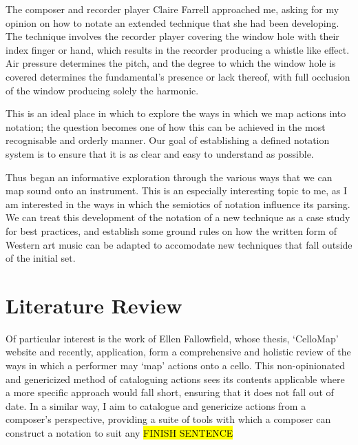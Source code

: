 The composer and recorder player Claire Farrell approached me, asking for my opinion on how to notate an extended technique that she had been developing. 
The technique involves the recorder player covering the window hole with their index finger or hand, which results in the recorder producing a whistle like effect. 
Air pressure determines the pitch, and the degree to which the window hole is covered determines the fundamental's presence or lack thereof, with full occlusion of the window producing solely the harmonic. 

This is an ideal place in which to explore the ways in which we map actions into notation; the question becomes one of how this can be achieved in the most recognisable and orderly manner. 
Our goal of establishing a defined notation system is to ensure that it is as clear and easy to understand as possible. 

Thus began an informative exploration through the various ways that we can map sound onto an instrument. 
This is an especially interesting topic to me, as I am interested in the ways in which the semiotics of notation influence its parsing. 
We can treat this development of the notation of a new technique as a case study for best practices, and establish some ground rules on how the written form of Western art music can be adapted to accomodate new techniques that fall outside of the initial set.

\section{Literature Review}
Of particular interest is the work of Ellen Fallowfield, whose thesis, `CelloMap' website and recently, application, form a comprehensive and holistic review of the ways in which a performer may `map' actions onto a cello.\autocite[]{fallowfieldCelloMapHandbook2009,fallowfieldCelloMap}
This non-opinionated and genericized method of cataloguing actions sees its contents applicable where a more specific approach would fall short, ensuring that it does not fall out of date.
In a similar way, I aim to catalogue and genericize actions from a composer's perspective, providing a suite of tools with which a composer can construct a notation to suit any \hl{FINISH SENTENCE}

